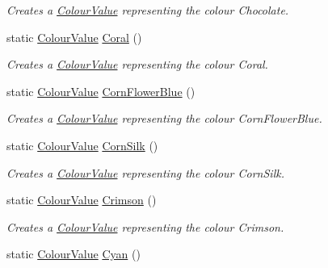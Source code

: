 \begin{DoxyCompactItemize}
\begin{DoxyCompactList}\small\item\em Creates a \hyperlink{classMezzanine_1_1ColourValue}{ColourValue} representing the colour Chocolate. \item\end{DoxyCompactList}\item 
static \hyperlink{classMezzanine_1_1ColourValue}{ColourValue} \hyperlink{classMezzanine_1_1ColourValue_af59ef464ea389ba92645211cef6f7867}{Coral} ()
\begin{DoxyCompactList}\small\item\em Creates a \hyperlink{classMezzanine_1_1ColourValue}{ColourValue} representing the colour Coral. \item\end{DoxyCompactList}\item 
static \hyperlink{classMezzanine_1_1ColourValue}{ColourValue} \hyperlink{classMezzanine_1_1ColourValue_a139ccffc46f72758ff4d9c86bd1d3a25}{CornFlowerBlue} ()
\begin{DoxyCompactList}\small\item\em Creates a \hyperlink{classMezzanine_1_1ColourValue}{ColourValue} representing the colour CornFlowerBlue. \item\end{DoxyCompactList}\item 
static \hyperlink{classMezzanine_1_1ColourValue}{ColourValue} \hyperlink{classMezzanine_1_1ColourValue_af9707bd2c82b85aacfa2a44fde982430}{CornSilk} ()
\begin{DoxyCompactList}\small\item\em Creates a \hyperlink{classMezzanine_1_1ColourValue}{ColourValue} representing the colour CornSilk. \item\end{DoxyCompactList}\item 
static \hyperlink{classMezzanine_1_1ColourValue}{ColourValue} \hyperlink{classMezzanine_1_1ColourValue_a9e9aadf32e75989cab3486750bba1137}{Crimson} ()
\begin{DoxyCompactList}\small\item\em Creates a \hyperlink{classMezzanine_1_1ColourValue}{ColourValue} representing the colour Crimson. \item\end{DoxyCompactList}\item 
static \hyperlink{classMezzanine_1_1ColourValue}{ColourValue} \hyperlink{classMezzanine_1_1ColourValue_a64cbddd02ae19f551796a4669a94783f}{Cyan} ()

\end{DoxyCompactItemize}
